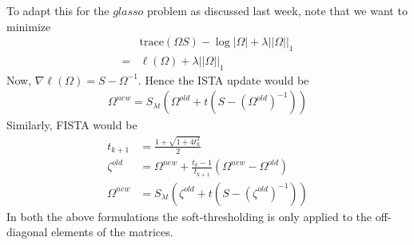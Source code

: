 \documentclass[12pt, leqno]{article}
\newcommand{\norm}[1]{\left|\left|#1\right|\right|}
\theoremstyle{remark}
\begin{document}
To adapt this for the $glasso$ problem as discussed last week, note that we want to minimize
\begin{align*}
&\text{trace}(\Omega S) - \log |\Omega| + \lambda \norm{\Omega}_1 \\
=&\ell(\Omega) + \lambda \norm{\Omega}_1
\end{align*}
Now, $\nabla \ell(\Omega) = S - \Omega^{-1} $. Hence the ISTA update would be 
\begin{align*}
\Omega^{new} = S_{\lambda t}(\Omega^{old} + t (S - (\Omega^{old})^{-1}))
\end{align*}
Similarly, FISTA would be 
\begin{align*}
t_{k+1} &= \frac{1 + \sqrt{1+4t_k^2}}{2}\\
\zeta^{old} &= \Omega^{new} + \frac{t_k-1}{t_{k+1}}(\Omega^{new}  - \Omega^{old} )\\
\Omega^{new} &= S_{\lambda t}(\zeta^{old} + t (S - (\zeta^{old})^{-1})) 
\end{align*}
In both the above formulations the soft-thresholding is only applied to the off-diagonal elements of the matrices.

\pagebreak
\end{document}
